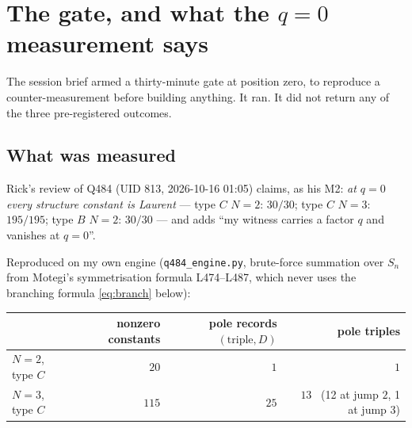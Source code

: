 \documentclass[11pt]{article}
\theoremstyle{plain}
\theoremstyle{definition}
\theoremstyle{remark}
\theoremstyle{plain}
\begin{document}
\begin{abstract}
I report the scope honestly: the minimal-$\nu$ stratum is $1/1$ of the
jump-$\ge2$ triples at $N=2$, $12/13$ at $N=3$, but only $99/127$ at $N=4$,
$690/1136$ at $N=5$ and $4335/9748$ at $N=6$.  \textbf{Coverage decreases with
$N$}, so this is a partial closure, not a closure, and the residual gap
\texttt{propagation} is the bulk of the problem rather than an edge case.  It
is now a precisely stated non-cancellation in the recursion of
Theorem~\ref{thm:recursion}, rather than ``the absence of conspiratorial
cancellation'' among branch terms.
\end{abstract}

\tableofcontents

\section{The gate, and what the \texorpdfstring{$q=0$}{q=0} measurement says}
\label{sec:gate}

The session brief armed a thirty-minute gate at position zero, to reproduce a
counter-measurement before building anything.  It ran.  It did not return any
of the three pre-registered outcomes.

\subsection{What was measured}

Rick's review of Q484 (UID 813, 2026-10-16 01:05) claims, as his M2:
\emph{at $q=0$ every structure constant is Laurent} --- type $C$ $N=2$:
$30/30$; type $C$ $N=3$: $195/195$; type $B$ $N=2$: $30/30$ --- and adds
``my witness carries a factor $q$ and vanishes at $q=0$''.

Reproduced on my own engine (\texttt{q484\_engine.py}, brute-force summation
over $S_n$ from Motegi's symmetrisation formula L474--L487, which never uses
the branching formula \eqref{eq:branch} below):

\begin{center}
\begin{tabular}{@{}lrrr@{}}
\toprule
 & nonzero constants & pole records $(\text{triple},D)$ & pole triples \\
\midrule
$N=2$, type $C$ & $20$ & $1$ & $1$ \\
$N=3$, type $C$ & $115$ & $25$ & $13$ \ (12 at jump $2$, 1 at jump $3$) \\
\bottomrule
\end{tabular}
\end{center}
\end{document}
